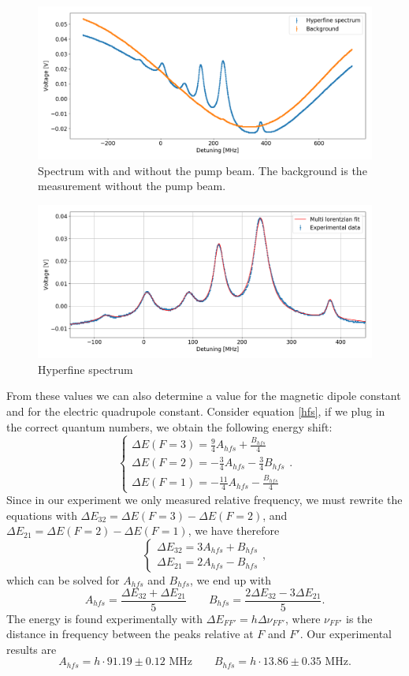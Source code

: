\documentclass[a4paper,10pt]{article}
\begin{document}
\begin{figure}[H]
    \centering
     \includegraphics[width=\textwidth]{spectrum.png}
    \caption{Spectrum with and without the pump beam. The background is the measurement without the pump beam.}\label{broadenedspectrum}
\end{figure}
\begin{figure}[H]
    \centering
     \includegraphics[width=\textwidth]{hyperfinespectrum.png}
    \caption{Hyperfine spectrum}\label{hyperfinespectrum}
\end{figure}
From these values we can also determine a value for the magnetic dipole constant and for the electric quadrupole constant. Consider equation \eqref{hfs}, if we plug in the correct quantum numbers, we obtain the following energy shift:
\[\begin{cases}
\Delta E(F=3) = \frac{9}{4}A_{hfs} + \frac{B_{hfs}}{4}\\
\Delta E(F=2) = -\frac{3}{4}A_{hfs} - \frac{3}{4}B_{hfs}\\
\Delta E(F=1) = -\frac{11}{4}A_{hfs} - \frac{B_{hfs}}{4}
\end{cases}.\]
Since in our experiment we only measured relative frequency, we must rewrite the equations with $\Delta E_{32} = \Delta E(F=3) - \Delta E(F=2)$, and $\Delta E_{21}=\Delta E(F=2)-\Delta E(F=1)$, we have therefore
\[\begin{cases}
\Delta E_{32} = 3A_{hfs} + B_{hfs}\\
\Delta E_{21} = 2A_{hfs}-B_{hfs}
\end{cases},\]
which can be solved for $A_{hfs}$ and $B_{hfs}$, we end up with
\[A_{hfs} = \frac{\Delta E_{32} + \Delta E_{21}}{5} \qquad B_{hfs} = \frac{2\Delta E_{32} - 3\Delta E_{21}}{5}.\]
The energy is found experimentally with $\Delta E_{FF'} = h\Delta\nu_{FF'}$, where $\nu_{FF'}$ is the distance in frequency between the peaks relative at $F$ and $F'$. Our experimental results are
\[A_{hfs} = h \cdot 91.19\pm 0.12\,\, \text{MHz}\qquad B_{hfs} = h\cdot 13.86\pm0.35\,\, \text{MHz}.\]
\end{document}
